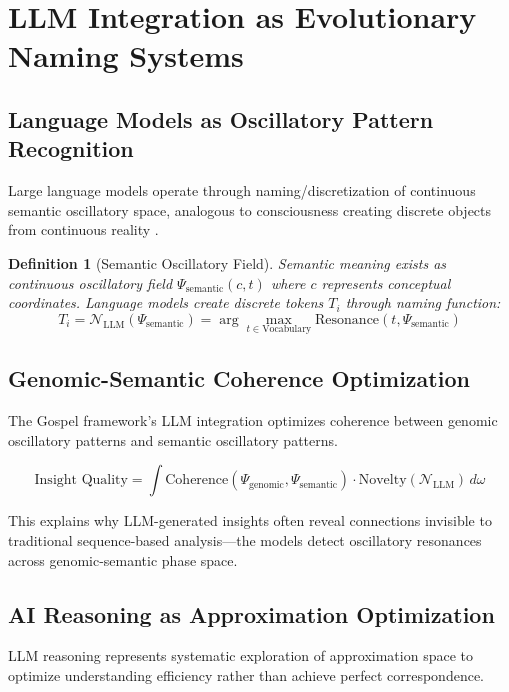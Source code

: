 \documentclass[12pt,a4paper]{article}
\newtheorem{definition}[theorem]{Definition}
\begin{document}
\section{LLM Integration as Evolutionary Naming Systems}

\subsection{Language Models as Oscillatory Pattern Recognition}

Large language models operate through naming/discretization of continuous semantic oscillatory space, analogous to consciousness creating discrete objects from continuous reality \cite{oscillatory2024truth}.

\begin{definition}[Semantic Oscillatory Field]
Semantic meaning exists as continuous oscillatory field $\Psi_{\text{semantic}}(c,t)$ where $c$ represents conceptual coordinates. Language models create discrete tokens $T_i$ through naming function:
$$T_i = \mathcal{N}_{\text{LLM}}(\Psi_{\text{semantic}}) = \arg\max_{t \in \text{Vocabulary}} \text{Resonance}(t, \Psi_{\text{semantic}})$$
\end{definition}

\subsection{Genomic-Semantic Coherence Optimization}

The Gospel framework's LLM integration optimizes coherence between genomic oscillatory patterns and semantic oscillatory patterns.

$$\text{Insight Quality} = \int \text{Coherence}(\Psi_{\text{genomic}}, \Psi_{\text{semantic}}) \cdot \text{Novelty}(\mathcal{N}_{\text{LLM}}) \, d\omega$$

This explains why LLM-generated insights often reveal connections invisible to traditional sequence-based analysis—the models detect oscillatory resonances across genomic-semantic phase space.

\subsection{AI Reasoning as Approximation Optimization}

LLM reasoning represents systematic exploration of approximation space to optimize understanding efficiency rather than achieve perfect correspondence.
\end{document}
